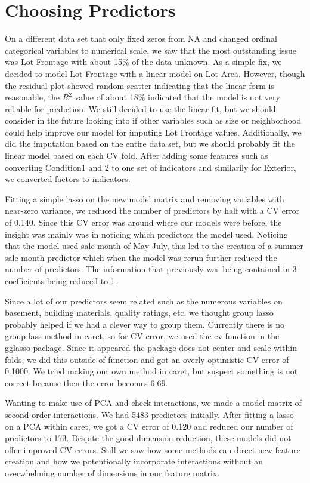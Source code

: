 \documentclass[12pt]{article}
\begin{document}
\section{Choosing Predictors}

On a different data set that only fixed zeros from NA and changed ordinal categorical variables to numerical scale, we saw that the most outstanding issue was Lot Frontage with about 15\% of the data unknown.  As a simple fix, we decided to model Lot Frontage with a linear model on Lot Area.  However, though the residual plot showed random scatter indicating that the linear form is reasonable, the $R^2$ value of about 18\% indicated that the model is not very reliable for prediction.  We still decided to use the linear fit, but we should consider in the future looking into if other variables such as size or neighborhood could help improve our model for imputing Lot Frontage values. Additionally, we did the imputation based on the entire data set, but we should probably fit the linear model based on each CV fold.  After adding some features such as converting Condition1 and 2 to one set of indicators and similarily for Exterior, we converted factors to indicators.

Fitting a simple lasso on the new model matrix and removing variables with near-zero variance, we reduced the number of predictors by half with a CV error of 0.140.  Since this CV error was around where our models were before, the insight was mainly was in noticing which predictors the model used. Noticing that the model used sale month of May-July, this led to the creation of a summer sale month predictor which when the model was rerun further reduced the number of predictors.  The information that previously was being contained in 3 coefficients being reduced to 1.

Since a lot of our predictors seem related such as the numerous variables on basement, building materials, quality ratings, etc. we thought group lasso probably helped if we had a clever way to group them. Currently there is no group lass method in caret, so for CV error, we used the cv function in the gglasso package.  Since it appeared the package does not center and scale within folds, we did this outside of function and got an overly optimistic CV error of 0.1000. We tried making our own method in caret, but suspect something is not correct because then the error becomes 6.69.

Wanting to make use of PCA and check interactions, we made a model matrix of second order interactions. We had 5483 predictors initially. After fitting a lasso on a PCA within caret, we got a CV error of 0.120 and reduced our number of predictors to 173. Despite the good dimension reduction, these models did not offer improved CV errors.  Still we saw how some methods can direct new feature creation and how we potentionally incorporate interactions without an overwhelming number of dimensions in our feature matrix.
\end{document}
